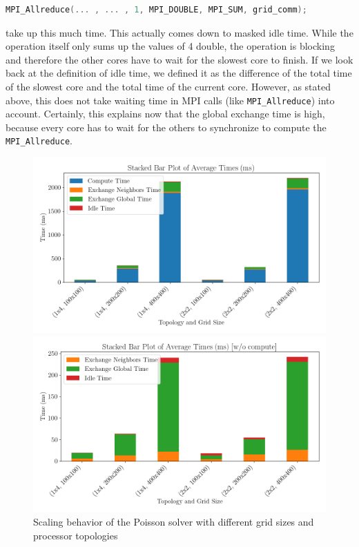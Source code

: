 \begin{lstlisting}[language=c]
MPI_Allreduce(... , ... , 1, MPI_DOUBLE, MPI_SUM, grid_comm);
\end{lstlisting}
take up this much time. This actually comes down to masked idle time. While the operation itself only sums up the values of 4 double, the operation is blocking and therefore the other cores have to wait for the slowest core to finish. If we look back at the definition of idle time, we defined it as the difference of the total time of the slowest core and the total time of the current core. However, as stated above, this does not take waiting time in MPI calls (like \texttt{MPI\_Allreduce}) into account. Certainly, this explains now that the global exchange time is high, because every core has to wait for the others to synchronize to compute the \texttt{MPI\_Allreduce}.\\
\begin{figure}[H]
    \centering
    \begin{minipage}{0.48\textwidth}
        \centering
        \includegraphics[width=\linewidth]{../fig/lab2/average_times_stacked_bar_22.png}
    \end{minipage}%
    \hspace{0.02\textwidth}
    \begin{minipage}{0.48\textwidth}
        \centering
        \includegraphics[width=\linewidth]{../fig/lab2/average_times_stacked_bar_no_comp_22.png}
    \end{minipage}
    \caption{Scaling behavior of the Poisson solver with different grid sizes and processor topologies}
    \label{fig:timingbar}
\end{figure}
